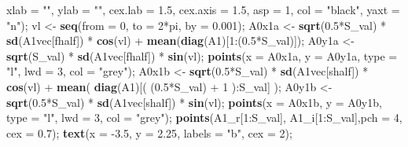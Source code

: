 \documentclass[]{article}
\newenvironment{Shaded}{\begin{snugshade}}{\end{snugshade}}
\newcommand{\KeywordTok}[1]{\textcolor[rgb]{0.13,0.29,0.53}{\textbf{{#1}}}}
\newcommand{\DataTypeTok}[1]{\textcolor[rgb]{0.13,0.29,0.53}{{#1}}}
\newcommand{\DecValTok}[1]{\textcolor[rgb]{0.00,0.00,0.81}{{#1}}}
\newcommand{\FloatTok}[1]{\textcolor[rgb]{0.00,0.00,0.81}{{#1}}}
\newcommand{\StringTok}[1]{\textcolor[rgb]{0.31,0.60,0.02}{{#1}}}
\newcommand{\NormalTok}[1]{{#1}}
\begin{document}
\begin{Shaded}
\begin{Highlighting}[]
         \DataTypeTok{xlab =} \StringTok{""}\NormalTok{, }\DataTypeTok{ylab =} \StringTok{""}\NormalTok{, }\DataTypeTok{cex.lab =} \FloatTok{1.5}\NormalTok{, }\DataTypeTok{cex.axis =} \FloatTok{1.5}\NormalTok{, }\DataTypeTok{asp =} \DecValTok{1}\NormalTok{, }
         \DataTypeTok{col =} \StringTok{"black"}\NormalTok{, }\DataTypeTok{yaxt =} \StringTok{"n"}\NormalTok{);}
    \NormalTok{vl <-}\StringTok{ }\KeywordTok{seq}\NormalTok{(}\DataTypeTok{from =} \DecValTok{0}\NormalTok{, }\DataTypeTok{to =} \DecValTok{2}\NormalTok{*pi, }\DataTypeTok{by =} \FloatTok{0.001}\NormalTok{);}
    \NormalTok{A0x1a <-}\StringTok{ }\KeywordTok{sqrt}\NormalTok{(}\FloatTok{0.5}\NormalTok{*S_val) *}\StringTok{ }\KeywordTok{sd}\NormalTok{(A1vec[fhalf]) *}\StringTok{ }\KeywordTok{cos}\NormalTok{(vl) +}\StringTok{ }\KeywordTok{mean}\NormalTok{(}\KeywordTok{diag}\NormalTok{(A1)[}\DecValTok{1}\NormalTok{:(}\FloatTok{0.5}\NormalTok{*S_val)]);}
    \NormalTok{A0y1a <-}\StringTok{ }\KeywordTok{sqrt}\NormalTok{(S_val) *}\StringTok{ }\KeywordTok{sd}\NormalTok{(A1vec[fhalf]) *}\StringTok{ }\KeywordTok{sin}\NormalTok{(vl);}
    \KeywordTok{points}\NormalTok{(}\DataTypeTok{x =} \NormalTok{A0x1a, }\DataTypeTok{y =} \NormalTok{A0y1a, }\DataTypeTok{type =} \StringTok{"l"}\NormalTok{, }\DataTypeTok{lwd =} \DecValTok{3}\NormalTok{, }\DataTypeTok{col =} \StringTok{"grey"}\NormalTok{);}
    \NormalTok{A0x1b <-}\StringTok{ }\KeywordTok{sqrt}\NormalTok{(}\FloatTok{0.5}\NormalTok{*S_val) *}\StringTok{ }\KeywordTok{sd}\NormalTok{(A1vec[shalf]) *}\StringTok{ }\KeywordTok{cos}\NormalTok{(vl) +}\StringTok{ }
\StringTok{                  }\KeywordTok{mean}\NormalTok{( }\KeywordTok{diag}\NormalTok{(A1)[( (}\FloatTok{0.5}\NormalTok{*S_val) +}\StringTok{ }\DecValTok{1} \NormalTok{):S_val] );}
    \NormalTok{A0y1b <-}\StringTok{ }\KeywordTok{sqrt}\NormalTok{(}\FloatTok{0.5}\NormalTok{*S_val) *}\StringTok{ }\KeywordTok{sd}\NormalTok{(A1vec[shalf]) *}\StringTok{ }\KeywordTok{sin}\NormalTok{(vl);}
    \KeywordTok{points}\NormalTok{(}\DataTypeTok{x =} \NormalTok{A0x1b, }\DataTypeTok{y =} \NormalTok{A0y1b, }\DataTypeTok{type =} \StringTok{"l"}\NormalTok{, }\DataTypeTok{lwd =} \DecValTok{3}\NormalTok{, }\DataTypeTok{col =} \StringTok{"grey"}\NormalTok{);}
    \KeywordTok{points}\NormalTok{(A1_r[}\DecValTok{1}\NormalTok{:S_val], A1_i[}\DecValTok{1}\NormalTok{:S_val],}\DataTypeTok{pch =} \DecValTok{4}\NormalTok{, }\DataTypeTok{cex =} \FloatTok{0.7}\NormalTok{);   }
    \KeywordTok{text}\NormalTok{(}\DataTypeTok{x =} \NormalTok{-}\FloatTok{3.5}\NormalTok{, }\DataTypeTok{y =} \FloatTok{2.25}\NormalTok{, }\DataTypeTok{labels =} \StringTok{"b"}\NormalTok{, }\DataTypeTok{cex =} \DecValTok{2}\NormalTok{);}

\end{Highlighting}
\end{Shaded}
\end{document}
